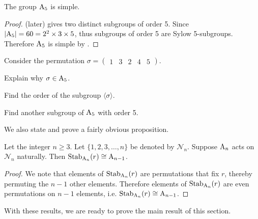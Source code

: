 \begin{corollary}\label{corollary-A5-is-simple}
    The group $\mathrm{A}_{5}$ is simple.
\end{corollary}
\begin{proof}
     (later) gives two distinct subgroups of order 5. Since $|\mathrm{A}_{5}| = 60 = 2^2 \times 3 \times 5$, thus subgroups of order 5 are Sylow 5-subgroups. Therefore $\mathrm{A}_{5}$ is simple by .
\end{proof}
\begin{exercise}\label{exercise-A5-has-two-distinct-subgroups-of-order-5}
    Consider the permutation $\sigma = \begin{pmatrix}1&3&2&4&5\end{pmatrix}$.
    \begin{partquestions}{\roman*}
        \item Explain why $\sigma \in \mathrm{A}_{5}$.
        \item Find the order of the subgroup $\langle \sigma \rangle$.
        \item Find another subgroup of $\mathrm{A}_{5}$ with order 5.
    \end{partquestions}
\end{exercise}

We also state and prove a fairly obvious proposition.

\begin{proposition}\label{prop-An-stabilizer-of-i-is-isomorphic-to-A(n-1)}
    Let the integer $n \geq 3$. Let $\{1, 2, 3, \dots, n\}$ be denoted by $\mathcal{N}_n$. Suppose $\mathrm{A}_{n}$ acts on $\mathcal{N}_n$ naturally. Then $\mathrm{Stab}_{\mathrm{A}_{n}}(r) \cong \mathrm{A}_{n-1}$.
\end{proposition}
\begin{proof}
    We note that elements of $\mathrm{Stab}_{\mathrm{A}_{n}}(r)$ are permutations that fix $r$, thereby permuting the $n - 1$ other elements. Therefore elements of $\mathrm{Stab}_{\mathrm{A}_{n}}(r)$ are even permutations on $n - 1$ elements, i.e. $\mathrm{Stab}_{\mathrm{A}_{n}}(r) \cong \mathrm{A}_{n-1}$.
\end{proof}

With these results, we are ready to prove the main result of this section.

